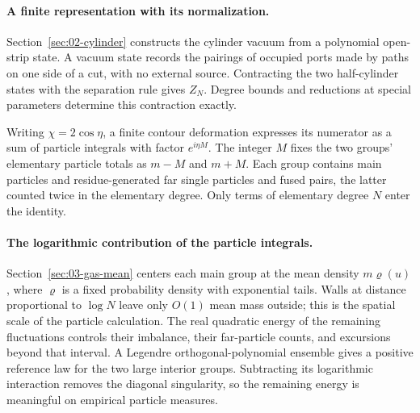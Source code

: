 \paragraph{A finite representation with its normalization.}
Section~\ref{sec:02-cylinder} constructs the cylinder vacuum from a
polynomial open-strip state. A vacuum state records the pairings of
occupied ports made by paths on one side of a cut, with no external
source. Contracting the two half-cylinder states with the separation
rule gives $Z_N$. Degree bounds and reductions at special parameters
determine this contraction exactly.

Writing $\chi=2\cos\eta$, a finite contour deformation expresses
its numerator as a sum of particle integrals with factor $e^{i\eta M}$.
The integer $M$ fixes the two groups' elementary particle totals as
$m-M$ and $m+M$. Each group contains main particles and
residue-generated far single particles and fused pairs, the latter
counted twice in the elementary degree.
Only terms of elementary degree $N$ enter the identity.

\paragraph{The logarithmic contribution of the particle integrals.}
Section~\ref{sec:03-gas-mean} centers each main group at the mean
density $m\varrho(u)$, where $\varrho$ is a fixed probability density
with exponential tails. Walls at distance proportional to $\log N$
leave only $O(1)$ mean mass outside; this is the spatial scale of the
particle calculation. The real quadratic energy of the remaining fluctuations
controls their imbalance, their far-particle counts, and excursions
beyond that interval. A Legendre orthogonal-polynomial ensemble gives
a positive reference law for the two large interior groups. Subtracting
its logarithmic interaction removes the diagonal singularity, so the
remaining energy is meaningful on empirical particle measures.

